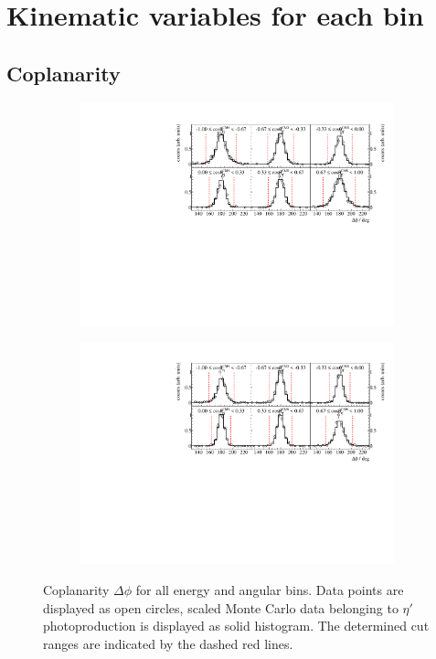 \section{Kinematic variables for each bin}
\label{sec:kinv}
\subsection{Coplanarity}
\begin{figure}[H]
	\centering
	\begin{subfigure}{\linewidth}
		\includegraphics[width=\linewidth]{../figs/hydrogen/bin_cuts/phicut_ebin1.pdf}
	\end{subfigure}

	\begin{subfigure}{\linewidth}
		\includegraphics[width=\linewidth]{../figs/hydrogen/bin_cuts/phicut_ebin2.pdf}
	\end{subfigure}
\caption{Coplanarity $\Delta\phi$ for all energy and angular bins. Data points are displayed as open circles, scaled Monte Carlo data belonging to $\eta'$ photoproduction is displayed as solid histogram. The determined cut ranges are indicated by the dashed red lines.}
\end{figure}

